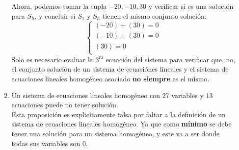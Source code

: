 \documentclass{article}
\begin{document}
\begin{enumerate}
\begin{enumerate}[label=\listAlph]
                Ahora, podemos tomar la tupla \(-20, -10, 30\) y verificar si es una solución para \(S_h\), y concluir si \(S_1\) y \(S_h\) tienen el mismo conjunto solución:
                \[
                    \left\{
                        \begin{aligned}
                            \left(-20\right) + \left(30\right) = 0 \\
                            \left(-10\right) + \left(30\right) = 0 \\
                            \left(30\right) = 0 \\
                        \end{aligned}
                    \right.
                \]
                Solo es necesario evaluar la \(3^{\text{ra}}\) ecuación del sistema para verificar que, no, el conjunto solucíón de un sistema de ecuaciónes lineales 
                y el sistema de ecuaciones lineales homogéneo asociado \textbf{no siempre} es el mismo.

			\item Un sistema de ecuaciones lineales homogéneo con 27 variables y 13 ecuaciones puede no tener solución. \\
                Esta proposición es explicitamente falsa por faltar a la definición de un sistema de ecuaciones lineales homogéneo. 
                Ya que como \textbf{mínimo} se debe tener una solución para un sistema homogéneo, y este va a ser donde todas sus variables son 0.
        \end{enumerate}
\end{enumerate}
\end{document}
